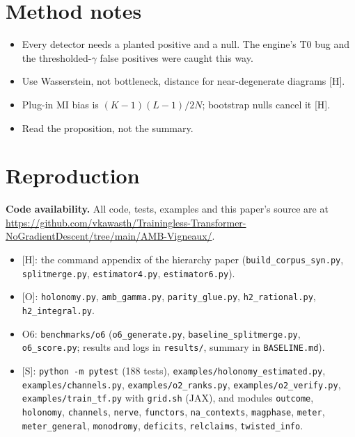 \documentclass[11pt]{article}
\theoremstyle{definition}
\theoremstyle{remark}
\newcommand{\src}[1]{\textsf{\small[#1]}}
\begin{document}
\section{Method notes}
\begin{itemize}
  \item Every detector needs a planted positive and a null. The engine's T0 bug and the thresholded-$\gamma$ false positives were caught this way.
  \item Use Wasserstein, not bottleneck, distance for near-degenerate diagrams \src{H}.
  \item Plug-in MI bias is $(K-1)(L-1)/2N$; bootstrap nulls cancel it \src{H}.
  \item Read the proposition, not the summary.
\end{itemize}

\section{Reproduction}
\textbf{Code availability.} All code, tests, examples and this paper's source are at \url{https://github.com/vkawasth/Trainingless-Transformer-NoGradientDescent/tree/main/AMB-Vigneaux/}.
\begin{itemize}
  \item \src{H}: the command appendix of the hierarchy paper (\texttt{build\_corpus\_syn.py}, \texttt{splitmerge.py}, \texttt{estimator4.py}, \texttt{estimator6.py}).
  \item \src{O}: \texttt{holonomy.py}, \texttt{amb\_gamma.py}, \texttt{parity\_glue.py}, \texttt{h2\_rational.py}, \texttt{h2\_integral.py}.
  \item O6: \texttt{benchmarks/o6} (\texttt{o6\_generate.py}, \texttt{baseline\_splitmerge.py}, \texttt{o6\_score.py}; results and logs in \texttt{results/}, summary in \texttt{BASELINE.md}).
  \item \src{S}: \texttt{python -m pytest} (188 tests), \texttt{examples/holonomy\_estimated.py}, \texttt{examples/channels.py}, \texttt{examples/o2\_ranks.py}, \texttt{examples/o2\_verify.py}, \texttt{examples/train\_tf.py} with \texttt{grid.sh} (JAX), and modules \texttt{outcome}, \texttt{holonomy}, \texttt{channels}, \texttt{nerve}, \texttt{functors}, \texttt{na\_contexts}, \texttt{magphase}, \texttt{meter}, \texttt{meter\_general}, \texttt{monodromy}, \texttt{deficits}, \texttt{relclaims}, \texttt{twisted\_info}.
\end{itemize}
\end{document}
